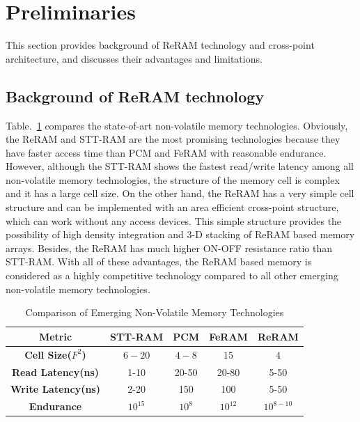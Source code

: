 \section{Preliminaries}\label{sec:preliminary}

This section provides background of ReRAM technology and cross-point architecture, and discusses their advantages and limitations. %


\subsection{Background of ReRAM technology}
Table.~\ref{table:compare} compares the state-of-art non-volatile memory technologies. Obviously, the ReRAM and STT-RAM are the most promising technologies because they have faster access time than PCM and FeRAM with reasonable endurance. However, although the STT-RAM shows the fastest read/write latency among all non-volatile memory technologies, the structure of the memory cell is complex and it has a large cell size. On the other hand, the ReRAM has a very simple cell structure and can be implemented with an area efficient cross-point structure, which can work without any access devices. This simple structure provides the possibility of high density integration and 3-D stacking of ReRAM based memory arrays. Besides, the ReRAM has much higher ON-OFF resistance ratio than STT-RAM. With all of these advantages, the ReRAM based memory is considered as a highly competitive technology compared to all other emerging non-volatile memory technologies.

\begin{table}[!tb]
  \centering
  \scriptsize
    \scriptsize
  \caption{Comparison of Emerging Non-Volatile Memory Technologies}\label{table:compare}
  \vspace{-5pt}
  \begin{tabular}{|c|cccc|}
    \hline
    \textbf{Metric} & \textbf{STT-RAM} & \textbf{PCM}    & \textbf{FeRAM} & \textbf{ReRAM}
    \\\hline
    \textbf{Cell Size($F^2$)} & $6-20$ & $4-8$ & $15$ & $4$\\\hline
    \textbf{Read Latency(ns)} &  1-10 & 20-50 & 20-80 & 5-50\\\hline
    \textbf{Write Latency(ns)} & 2-20& 150& 100& 5-50\\\hline
    \textbf{Endurance} &  $10^{15}$ & $10^8$ & $10^{12}$ & $10^{8-10}$\\\hline
  \end{tabular}
  \vspace{-10pt}
\end{table}


